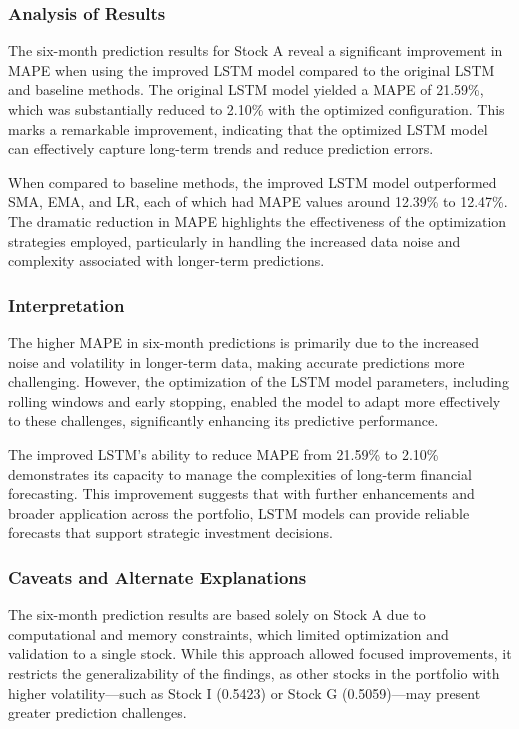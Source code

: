 \documentclass[10pt,twocolumn]{article}
\begin{document}
\subsubsection{Analysis of Results}

The six-month prediction results for Stock A reveal a significant improvement in MAPE when using the improved LSTM model compared to the original LSTM and baseline methods. The original LSTM model yielded a MAPE of 21.59\%, which was substantially reduced to 2.10\% with the optimized configuration. This marks a remarkable improvement, indicating that the optimized LSTM model can effectively capture long-term trends and reduce prediction errors.

When compared to baseline methods, the improved LSTM model outperformed SMA, EMA, and LR, each of which had MAPE values around 12.39\% to 12.47\%. The dramatic reduction in MAPE highlights the effectiveness of the optimization strategies employed, particularly in handling the increased data noise and complexity associated with longer-term predictions.

\subsubsection{Interpretation}

The higher MAPE in six-month predictions is primarily due to the increased noise and volatility in longer-term data, making accurate predictions more challenging. However, the optimization of the LSTM model parameters, including rolling windows and early stopping, enabled the model to adapt more effectively to these challenges, significantly enhancing its predictive performance.

The improved LSTM's ability to reduce MAPE from 21.59\% to 2.10\% demonstrates its capacity to manage the complexities of long-term financial forecasting. This improvement suggests that with further enhancements and broader application across the portfolio, LSTM models can provide reliable forecasts that support strategic investment decisions.

\subsubsection{Caveats and Alternate Explanations}

The six-month prediction results are based solely on Stock A due to computational and memory constraints, which limited optimization and validation to a single stock. While this approach allowed focused improvements, it restricts the generalizability of the findings, as other stocks in the portfolio with higher volatility—such as Stock I (0.5423) or Stock G (0.5059)—may present greater prediction challenges.
\end{document}
